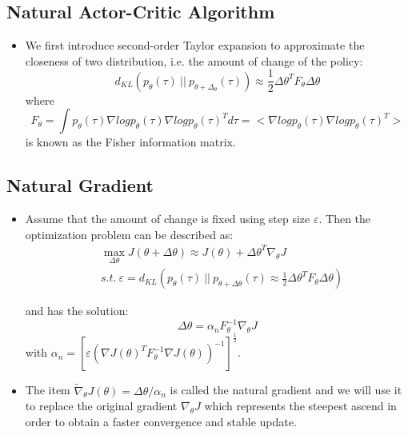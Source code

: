 {\begin{pcolumn}
\section{Natural Actor-Critic Algorithm}
\vspace*{-20mm}
%
{\large
\begin{itemize}
	\item We first introduce second-order Taylor expansion to approximate the closeness of two distribution, i.e. the amount of change of the policy: \vspace{-2mm}
\begin{equation}
	d_{KL} (p_\theta(\tau) \ || \ p_{\theta+\Delta_\theta}(\tau)) \approx \frac{1}{2} \Delta \theta^T F_\theta \Delta \theta
\end{equation}
where
\begin{equation}
	F_\theta = \int p_\theta(\tau) \nabla log p_\theta(\tau) \nabla log p_\theta (\tau)^T d\tau = \big<\nabla log p_\theta(\tau) \nabla log p_\theta(\tau)^T\big>
\end{equation}
is known as the Fisher information matrix.

\end{itemize}
\vspace*{2mm}
}

\subsection{Natural Gradient}
\vspace*{-17mm}
%
{\large
\begin{itemize}
	\item Assume that the amount of change is fixed using step size $\varepsilon$. Then the optimization problem can be described as:
\begin{eqnarray}
	& \max \limits_{\Delta\theta} J(\theta + \Delta\theta) \approx J(\theta) + \Delta\theta^T \nabla_\theta J \\
	& s.t.\  \varepsilon = d_{KL}(p_\theta(\tau) \ ||\ p_{\theta+\Delta\theta} (\tau) \approx \frac{1}{2} \Delta \theta^T F_\theta \Delta \theta)   \nonumber
\end{eqnarray}

and has the solution:
\begin{equation}
	\Delta \theta = \alpha_n F_\theta^{-1}\nabla_\theta J
\end{equation}
with $\alpha_n = [\varepsilon(\nabla J(\theta)^TF_\theta^{-1}\nabla J(\theta))^{-1}]^{\frac{1}{2}}$. 
	\item The item $\widetilde \nabla_\theta J(\theta) = \Delta \theta / \alpha_n$ is called the natural gradient and we will use it to replace the original gradient $\nabla_\theta J$ which represents the steepest ascend in order to obtain a faster convergence and stable update.


\end{itemize}}
\end{pcolumn}}
